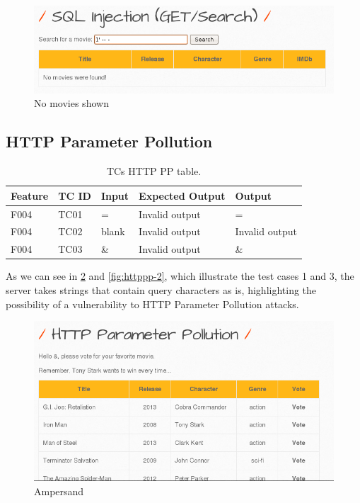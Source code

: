 \documentclass{article}
\begin{document}
\begin{figure}
    \centering
    \includegraphics[width=1\linewidth]{Figures/sqli/sqli_verybad.png}
    \caption{\label{fig:sqli-none}No movies shown}
\end{figure}

\subsection{HTTP Parameter Pollution}
\begin{table} [htpb]
    \centering
    \begin{tabular}{l|l|l|l|l}
        Feature & TC ID & Input & Expected Output & Output         \\ \hline
        F004    & TC01  & =     & Invalid output  & =              \\
        F004    & TC02  & blank & Invalid output  & Invalid output \\
        F004    & TC03  & \&    & Invalid output  & \&             \\
    \end{tabular}
    \caption{\label{tab:TC-SQLi-offensive}TCs HTTP PP table.}
\end{table}
As we can see in \ref{fig:httppp-1} and \ref{fig:httppp-2}, which illustrate the test cases 1 and 3, the server takes strings that contain query characters as is, highlighting the possibility of a vulnerability to HTTP Parameter Pollution attacks.

\begin{figure}
    \centering
    \includegraphics[width=1\linewidth]{Figures/httppp/http_oopsie.png}
    \caption{\label{fig:httppp-1}Ampersand}
\end{figure}
\end{document}
